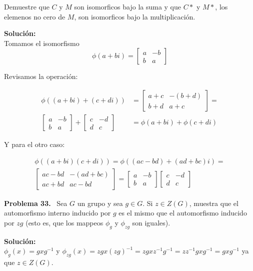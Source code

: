 \documentclass{article}
\newcounter{problem}
\newcounter{solution}
\newcommand\Problem[1]{%
  \stepcounter{problem}%
  \textbf{Problema #1.}~%
  \setcounter{solution}{0}%
}
\newcommand\TheSolution{%
  \textbf{Solución:}\\%
}
\begin{document}
Demuestre que $C$ y $M$ son isomorficos bajo la suma y que $C*$ y $M*$, los
elemenos no cero de $M$, son isomorficos bajo la multiplicación.

\TheSolution{}
Tomamos el isomorfismo
\[
\phi(a + bi)
  =
\begin{bmatrix}
  a & -b \\
  b & a
\end{bmatrix}
\]

Revisamos la operación:

\[
\begin{split}
  \phi((a + bi) + (c + di)) &=
  \begin{bmatrix}
    a + c & -(b + d) \\
    b + d & a + c
  \end{bmatrix}
  = \\
  \begin{bmatrix}
    a & -b \\
    b & a
  \end{bmatrix}
  +
  \begin{bmatrix}
    c & -d \\
    d & c
  \end{bmatrix}
  &=
  \phi(a + bi) + \phi(c + di)
\end{split}
\]

Y para el otro caso:


\begin{align}
  \phi((a + bi)(c + di)) = \phi((ac - bd) + (ad + bc)i) = \\
  \begin{bmatrix}
    ac - bd & -(ad + bc) \\
    ac + bd & ac - bd
  \end{bmatrix}
  =
  \begin{bmatrix}
    a & -b \\
    b & a
  \end{bmatrix}
  \begin{bmatrix}
    c & -d \\
    d & c
  \end{bmatrix}
\end{align}


\Problem{33} Sea $G$ un grupo y sea $g \in G$. Si $z \in Z(G)$, muestra que
el automorfismo interno inducido por $g$ es el mismo que el automorfismo
inducido por $zg$ (esto es, que los mappeos $\phi_g$ y $\phi_{zg}$ son
iguales).

\TheSolution{} $\phi_g(x) = gxg^{-1}$ y $\phi_{zg}(x) = zgx{(zg)}^{-1} =
zgxz^{-1}g^{-1} = zz^{-1}gxg^{-1} = gxg^{-1}$ ya que $z \in Z(G)$.
\end{document}
